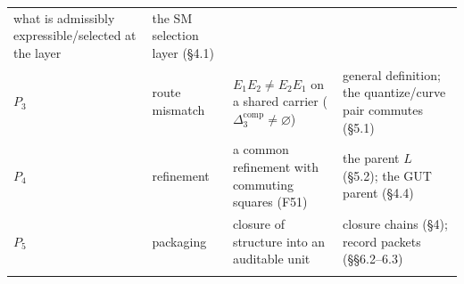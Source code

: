 \begin{longtable}[]{@{}llll@{}}
\begin{minipage}[t]{0.37\columnwidth}
what is admissibly expressible/selected at the layer\strut
\end{minipage} & \begin{minipage}[t]{0.22\columnwidth}\raggedright
the SM selection layer (§4.1)\strut
\end{minipage}\tabularnewline
\begin{minipage}[t]{0.11\columnwidth}\raggedright
\(P_3\)\strut
\end{minipage} & \begin{minipage}[t]{0.20\columnwidth}\raggedright
route mismatch\strut
\end{minipage} & \begin{minipage}[t]{0.37\columnwidth}\raggedright
\(E_1E_2 \ne E_2E_1\) on a shared carrier (\(\Delta_3^{\mathrm{comp}}\neq\varnothing\))\strut
\end{minipage} & \begin{minipage}[t]{0.22\columnwidth}\raggedright
general definition; the quantize/curve pair commutes (§5.1)\strut
\end{minipage}\tabularnewline
\begin{minipage}[t]{0.11\columnwidth}\raggedright
\(P_4\)\strut
\end{minipage} & \begin{minipage}[t]{0.20\columnwidth}\raggedright
refinement\strut
\end{minipage} & \begin{minipage}[t]{0.37\columnwidth}\raggedright
a common refinement with commuting squares (F51)\strut
\end{minipage} & \begin{minipage}[t]{0.22\columnwidth}\raggedright
the parent \(L\) (§5.2); the GUT parent (§4.4)\strut
\end{minipage}\tabularnewline
\begin{minipage}[t]{0.11\columnwidth}\raggedright
\(P_5\)\strut
\end{minipage} & \begin{minipage}[t]{0.20\columnwidth}\raggedright
packaging\strut
\end{minipage} & \begin{minipage}[t]{0.37\columnwidth}\raggedright
closure of structure into an auditable unit\strut
\end{minipage} & \begin{minipage}[t]{0.22\columnwidth}\raggedright
closure chains (§4); record packets (§§6.2--6.3)\strut
\end{minipage}\tabularnewline
\begin{minipage}[t]{0.11\columnwidth}\raggedright

\end{minipage}
\end{longtable}
